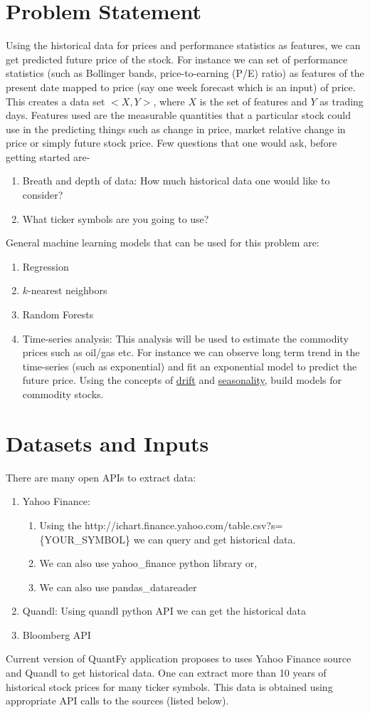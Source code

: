 \documentclass[12pt]{article}
\begin{document}
\section{Problem Statement}
\label{sec:prob}
Using the historical data for prices and performance statistics as features, we can get predicted future price of the stock. For instance we can set of performance statistics (such as Bollinger bands,  price-to-earning (P/E) ratio) as features of the present date mapped to price (say one week forecast which is an input) of price.
This creates a data set $<X,Y>$, where $X$ is the set of features and $Y$ as trading days.  Features used are the measurable quantities that a particular stock could use in the predicting things such as change in price, market relative change in price or simply future stock price. Few questions that one would ask, before getting started are-
\begin{enumerate}
\item Breath and depth of data: How much historical data one would like to consider?
\item What ticker symbols are you going to use?
\end{enumerate}
General machine learning models that can be used for this problem are:
\begin{enumerate}
\item Regression
\item $k$-nearest neighbors
\item Random Forests
\item Time-series analysis: This analysis will be used to estimate the commodity prices such as oil/gas etc. For instance we can observe long term trend in the time-series (such as exponential) and fit an exponential model to predict the future price. Using the concepts of \underline{drift} and \underline{seasonality}, build models for commodity stocks.
\end{enumerate}

\section{Datasets and Inputs} 
\label{sec:datasets}
There are many open APIs to extract data:
\begin{enumerate}
\item Yahoo Finance:
\begin{enumerate}
\item Using the http://ichart.finance.yahoo.com/table.csv?s=\{YOUR\_SYMBOL\} we can query and get historical data.
\item We can also use yahoo\_finance python library or,
\item We can also use pandas\_datareader
\end{enumerate}
\item Quandl: Using quandl python API we can get the historical data
\item Bloomberg API
\end{enumerate}
Current version of QuantFy application proposes to uses Yahoo Finance source and Quandl to get historical data. One can extract more than 10 years of historical stock prices for many ticker symbols. This data is obtained using appropriate API calls to the sources (listed below). 
\end{document}
